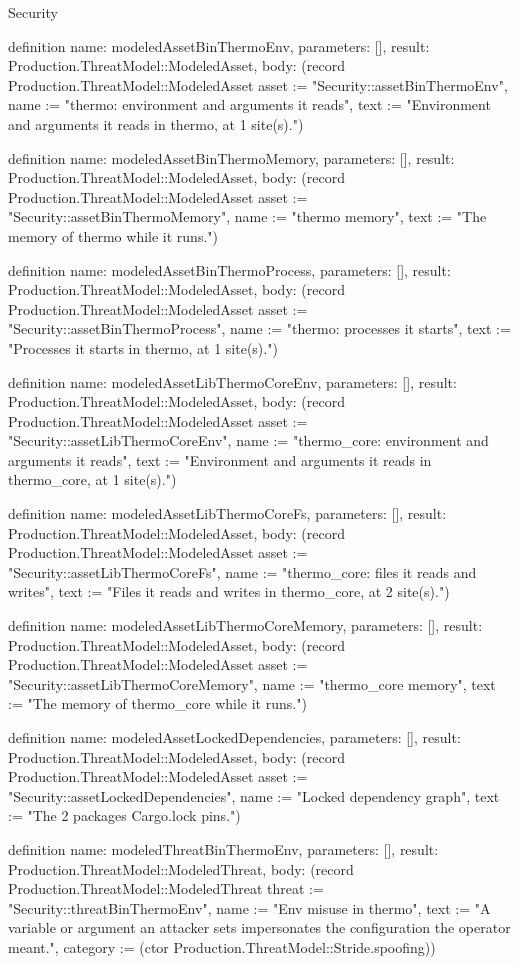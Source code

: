 \begin{lexlean}{Security}
\begin{semanticmodule}
definition{
  name: modeledAssetBinThermoEnv,
  parameters: [],
  result: Production.ThreatModel::ModeledAsset,
  body: (record Production.ThreatModel::ModeledAsset {asset := "Security::assetBinThermoEnv", name := "thermo: environment and arguments it reads", text := "Environment and arguments it reads in thermo, at 1 site(s)."})
}

definition{
  name: modeledAssetBinThermoMemory,
  parameters: [],
  result: Production.ThreatModel::ModeledAsset,
  body: (record Production.ThreatModel::ModeledAsset {asset := "Security::assetBinThermoMemory", name := "thermo memory", text := "The memory of thermo while it runs."})
}

definition{
  name: modeledAssetBinThermoProcess,
  parameters: [],
  result: Production.ThreatModel::ModeledAsset,
  body: (record Production.ThreatModel::ModeledAsset {asset := "Security::assetBinThermoProcess", name := "thermo: processes it starts", text := "Processes it starts in thermo, at 1 site(s)."})
}

definition{
  name: modeledAssetLibThermoCoreEnv,
  parameters: [],
  result: Production.ThreatModel::ModeledAsset,
  body: (record Production.ThreatModel::ModeledAsset {asset := "Security::assetLibThermoCoreEnv", name := "thermo_core: environment and arguments it reads", text := "Environment and arguments it reads in thermo_core, at 1 site(s)."})
}

definition{
  name: modeledAssetLibThermoCoreFs,
  parameters: [],
  result: Production.ThreatModel::ModeledAsset,
  body: (record Production.ThreatModel::ModeledAsset {asset := "Security::assetLibThermoCoreFs", name := "thermo_core: files it reads and writes", text := "Files it reads and writes in thermo_core, at 2 site(s)."})
}

definition{
  name: modeledAssetLibThermoCoreMemory,
  parameters: [],
  result: Production.ThreatModel::ModeledAsset,
  body: (record Production.ThreatModel::ModeledAsset {asset := "Security::assetLibThermoCoreMemory", name := "thermo_core memory", text := "The memory of thermo_core while it runs."})
}

definition{
  name: modeledAssetLockedDependencies,
  parameters: [],
  result: Production.ThreatModel::ModeledAsset,
  body: (record Production.ThreatModel::ModeledAsset {asset := "Security::assetLockedDependencies", name := "Locked dependency graph", text := "The 2 packages Cargo.lock pins."})
}

definition{
  name: modeledThreatBinThermoEnv,
  parameters: [],
  result: Production.ThreatModel::ModeledThreat,
  body: (record Production.ThreatModel::ModeledThreat {threat := "Security::threatBinThermoEnv", name := "Env misuse in thermo", text := "A variable or argument an attacker sets impersonates the configuration the operator meant.", category := (ctor Production.ThreatModel::Stride.spoofing)})
}


\end{semanticmodule}
\end{lexlean}
